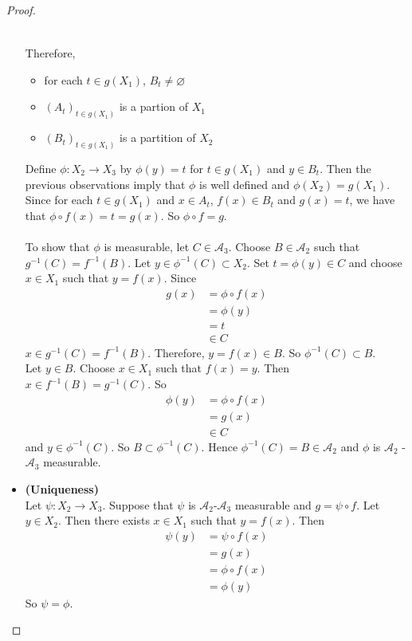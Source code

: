 \documentclass[12pt]{amsart}
\theoremstyle{definition}
\newcommand{\MA}{\mathcal{A}}
\begin{document}
\begin{proof}
\begin{itemize}
\begin{itemize}
\begin{align*}
				\end{align*}
			\end{itemize}
			Therefore, 
			\begin{itemize}
				\item for each $t \in g(X_1)$, $B_t \neq \varnothing$
				\item $(A_t)_{t \in g(X_1)}$ is a partion of $X_1$
				\item $(B_t)_{t \in g(X_1)}$ is a partition of $X_2$\\
			\end{itemize}		
			Define $\phi:X_2 \rightarrow X_3$ by $\phi(y) = t$ for $t \in g(X_1)$ and $y \in B_t $. Then the previous observations imply that $\phi$ is well defined and $\phi(X_2) = g(X_1)$. Since for each $t \in g(X_1)$ and $x \in A_t$, $f(x) \in B_t$ and $g(x) = t$, we have that $\phi \circ f (x) = t = g(x)$. So $\phi \circ f = g$. \\ \\
			To show that $\phi$ is measurable, let $C \in \MA_3$. Choose $B \in \MA_2$ such that $g^{-1}(C) = f^{-1}(B)$.
			Let $y \in \phi^{-1}(C) \subset X_2$. Set $t = \phi(y) \in C$ and choose $x \in X_1$ such that $y = f(x)$. Since 
			\begin{align*}
				g(x) 
				&= \phi \circ f (x) \\
				&= \phi(y) \\
				&= t \\
				&\in C
			\end{align*}		
			$x \in g^{-1}(C) = f^{-1}(B)$. Therefore, $y = f(x) \in B$. So $\phi^{-1}(C) \subset B$. \\
			Let $y \in B$. Choose $x \in X_1$ such that $f(x) = y$. Then $x \in f^{-1}(B) = g^{-1}(C)$. So 
			\begin{align*}
				\phi(y) 
				&= \phi \circ f (x) \\
				&= g(x) \\
				&\in C
			\end{align*}	 
			and $y \in \phi^{-1}(C)$. So $B \subset \phi^{-1}(C)$. 
			Hence $\phi^{-1}(C) = B \in \MA_2$ and $\phi$ is $\MA_2$ - $\MA_3$ measurable.\\
			\item \textbf{(Uniqueness)} \\
			Let $\psi: X_2 \rightarrow X_3$. Suppose that $\psi$ is $\MA_2$-$\MA_3$ measurable and $g = \psi \circ f$. Let $y \in X_2$. Then there exists $x \in X_1$ such that $y = f(x)$. Then 
			\begin{align*}
				\psi(y) 
				&= \psi \circ f(x) \\
				&= g(x) \\
				&= \phi \circ f(x) \\
				&= \phi(y)
			\end{align*}
			So $\psi = \phi$.
		\end{itemize}
		
	\end{proof}
	
\end{document}
